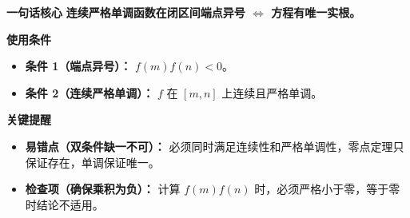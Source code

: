 \begin{summarybox}
	\textbf{\textcolor{CSummary}{一句话核心}}
	\textbf{连续严格单调函数在闭区间端点异号 $\Longleftrightarrow$ 方程有唯一实根。}

	\medskip
	\textbf{\textcolor{CSummary}{使用条件}}
	\begin{itemize}[leftmargin=*, itemsep=0.5em, topsep=0.4em]
		\item \textbf{条件 1（端点异号）：} $f(m)f(n)<0$。
		\item \textbf{条件 2（连续严格单调）：} $f$ 在 $[m,n]$ 上连续且严格单调。
	\end{itemize}

	\medskip
	\textbf{\textcolor{CSummary}{关键提醒}}
	\begin{itemize}[leftmargin=*, itemsep=0.5em, topsep=0.4em]
		\item \textbf{易错点（双条件缺一不可）：} 必须同时满足连续性和严格单调性，零点定理只保证存在，单调保证唯一。
		\item \textbf{检查项（确保乘积为负）：} 计算 $f(m)f(n)$ 时，必须严格小于零，等于零时结论不适用。
	\end{itemize}

\end{summarybox}
